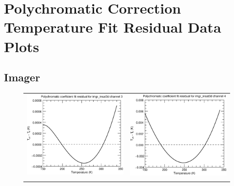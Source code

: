 \section{Polychromatic Correction Temperature Fit Residual Data Plots}
\label{app.tfit_data_plots}

\subsection{Imager}

\begin{figure}[H]
  \centering
  \begin{tabular}{c c}
    \includegraphics[scale=0.35]{graphics/imgr/tfit/imgr_insat3d-3.tfit.eps} &
    \includegraphics[scale=0.35]{graphics/imgr/tfit/imgr_insat3d-4.tfit.eps} \\\\

\end{tabular}
\end{figure}
